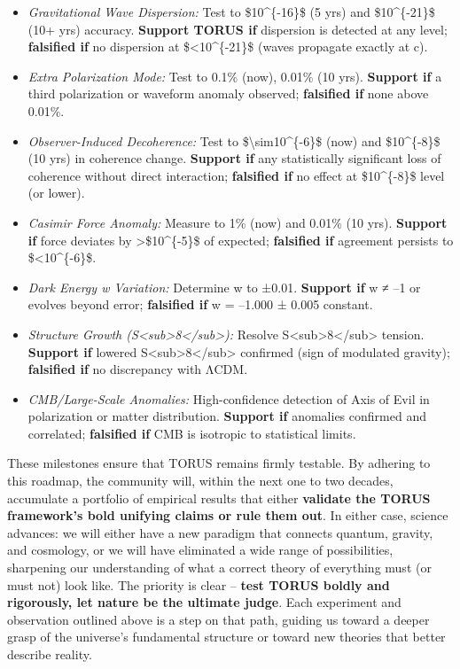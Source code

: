 \begin{itemize}
\item
  \emph{Gravitational Wave Dispersion:} Test to \$10\^{}\{-16\}\$ (5
  yrs) and \$10\^{}\{-21\}\$ (10+ yrs) accuracy. \textbf{Support TORUS
  if} dispersion is detected at any level; \textbf{falsified if} no
  dispersion at \$\textless{}10\^{}\{-21\}\$ (waves propagate exactly at
  c)​.
\item
  \emph{Extra Polarization Mode:} Test to 0.1\% (now), 0.01\% (10 yrs).
  \textbf{Support if} a third polarization or waveform anomaly observed;
  \textbf{falsified if} none above 0.01\%​.
\item
  \emph{Observer-Induced Decoherence:} Test to
  \$\textbackslash{}sim10\^{}\{-6\}\$ (now) and \$10\^{}\{-8\}\$ (10
  yrs) in coherence change. \textbf{Support if} any statistically
  significant loss of coherence without direct interaction;
  \textbf{falsified if} no effect at \$10\^{}\{-8\}\$ level (or lower)​.
\item
  \emph{Casimir Force Anomaly:} Measure to 1\% (now) and 0.01\% (10
  yrs). \textbf{Support if} force deviates by
  \textgreater{}\$10\^{}\{-5\}\$ of expected​; \textbf{falsified if}
  agreement persists to \$\textless{}10\^{}\{-6\}\$.
\item
  \emph{Dark Energy w Variation:} Determine w to ±0.01. \textbf{Support
  if} w ≠ --1 or evolves beyond error; \textbf{falsified if} w = --1.000
  ± 0.005 constant​.
\item
  \emph{Structure Growth
  (S\textless{}sub\textgreater{}8\textless{}/sub\textgreater{}):}
  Resolve S\textless{}sub\textgreater{}8\textless{}/sub\textgreater{}
  tension. \textbf{Support if} lowered
  S\textless{}sub\textgreater{}8\textless{}/sub\textgreater{} confirmed
  (sign of modulated gravity)​; \textbf{falsified if} no discrepancy
  with ΛCDM.
\item
  \emph{CMB/Large-Scale Anomalies:} High-confidence detection of Axis of
  Evil in polarization or matter distribution. \textbf{Support if}
  anomalies confirmed and correlated​; \textbf{falsified if} CMB is
  isotropic to statistical limits​.
\end{itemize}

These milestones ensure that TORUS remains firmly testable. By adhering
to this roadmap, the community will, within the next one to two decades,
accumulate a portfolio of empirical results that either \textbf{validate
the TORUS framework's bold unifying claims or rule them out}. In either
case, science advances: we will either have a new paradigm that connects
quantum, gravity, and cosmology, or we will have eliminated a wide range
of possibilities, sharpening our understanding of what a correct theory
of everything must (or must not) look like. The priority is clear --
\textbf{test TORUS boldly and rigorously, let nature be the ultimate
judge}. Each experiment and observation outlined above is a step on that
path, guiding us toward a deeper grasp of the universe's fundamental
structure or toward new theories that better describe reality.
